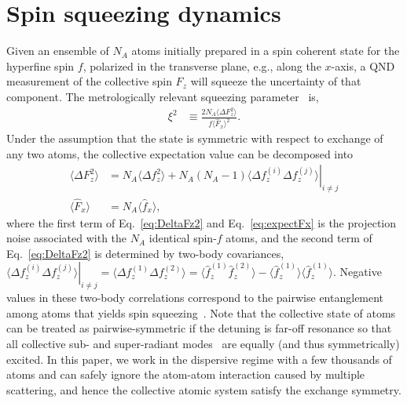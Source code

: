 \documentclass[preprint,aps,pra,onecolumn,superscriptaddress]{revtex4-1} %
\newcommand{\expect}[1]{\big\langle #1 \big\rangle}
\begin{document}
\section{Spin squeezing dynamics}

Given an ensemble of $N_A$ atoms initially prepared in a spin coherent state for the hyperfine spin $f$, polarized in the transverse plane, e.g., along the $x$-axis, a QND measurement of the collective spin  $F_z$ will squeeze the uncertainty of that component.  The metrologically relevant squeezing parameter~\cite{Wineland1992} is,
\begin{align}\label{eq:xi2Faraday}
\xi^2 &\equiv  \frac{2 N_A\expect{\Delta F_z ^2}}{f\expect{\hat{F}_x}^2}.
\end{align}
Under the assumption that the state is symmetric with respect to exchange of any two atoms, the collective expectation value can be decomposed into 
\begin{subequations}\label{eq:Ftof_squeezing}
\begin{align}
\expect{\Delta F_z^2} &= N_A \expect{\Delta f_z^2}+N_A(N_A-1)\left. \expect{\Delta f_z^{(i)}\Delta f_z^{(j)}}\right|_{i\neq j}\label{eq:DeltaFz2}\\
\expect{\hat{F}_x } & =N_A \expect{\hat{f}_x},\label{eq:expectFx}
\end{align}
\end{subequations}
where the first term of Eq.~\eqref{eq:DeltaFz2} and Eq.~\eqref{eq:expectFx} is the projection noise associated with the  $N_A$ identical spin-$f$  atoms, and  the second term of Eq.~\eqref{eq:DeltaFz2} is determined by two-body covariances, $ \left.\expect{\Delta f_z^{(i)}\Delta f_z^{(j)}}\right|_{i\neq j}=\expect{\Delta f_z^{(1)}\Delta f_z^{(2)}} = \expect{\hat{f}_z^{(1)}\hat{f}_z^{(2)}}-\expect{\hat{f}_z^{(1)}} \expect{\hat{f}_z^{(1)}} $.  Negative values in these two-body correlations correspond to the pairwise entanglement among atoms that yields spin squeezing~\cite{Wang2003Spin}.  Note that the collective state of atoms can be treated as pairwise-symmetric if the detuning is far-off resonance so that all collective sub- and super-radiant modes~\cite{Asenjo-Garcia2017Atom,Asenjo-Garcia2017Exponential} are equally (and thus symmetrically) excited.  In this paper, we work in the dispersive regime with a few thousands of atoms and can safely ignore the atom-atom interaction caused by multiple scattering, and hence the collective atomic system satisfy the exchange symmetry. 
\end{document}
